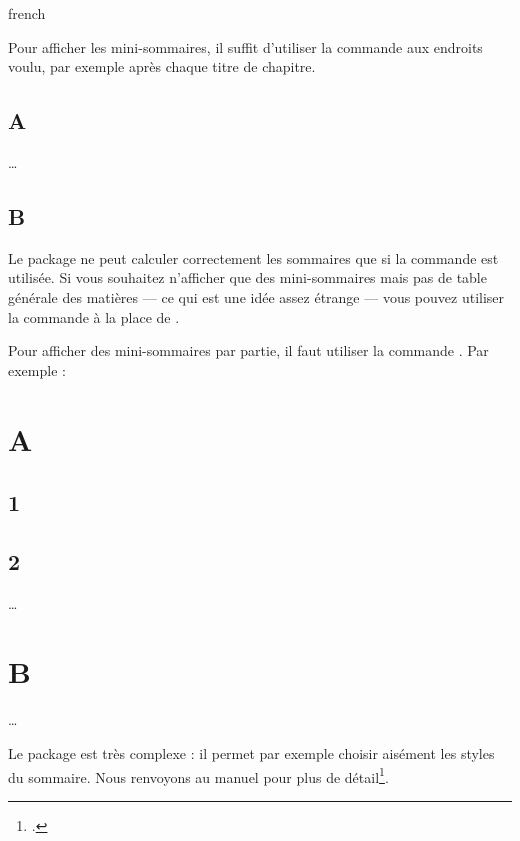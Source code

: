 \begin{latexcode}
\usepackage{minitoc}{french}
\dominitoc
\end{latexcode}

Pour afficher les mini-sommaires, il suffit d'utiliser la commande  aux endroits voulu, par exemple après chaque titre de chapitre.

\begin{latexcode}
\chapter{A}
\minitoc
…
\chapter{B}
\minitoc
\end{latexcode}

\begin{attention}
Le package ne peut calculer correctement les sommaires que si la commande  est utilisée. Si vous souhaitez n'afficher que des mini-sommaires mais pas de table générale des matières --- ce qui est une idée assez étrange --- vous pouvez utiliser  la commande  à la place de .
\end{attention}

Pour afficher des mini-sommaires par partie, il faut utiliser la commande . Par exemple :

\begin{latexcode}
\part{A}
\parttoc
\chapter{1}
\chapter{2}
…
\part{B}
\parttoc
…
\end{latexcode}


Le package  est très complexe : il permet par exemple choisir aisément les styles du sommaire. Nous renvoyons au manuel pour plus de détail\footcites{minitoc}[en particulier][]{minitoc_typesetting}.

